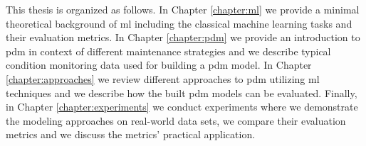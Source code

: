 \begin{introduction}
This thesis is organized as follows.
In Chapter \ref{chapter:ml} we provide a minimal theoretical background of \acrshort{ml} including the classical machine learning tasks and their evaluation metrics.
In Chapter \ref{chapter:pdm} we provide an introduction to \acrshort{pdm} in context of different maintenance strategies and we describe typical condition monitoring data used for building a \acrshort{pdm} model.
In Chapter \ref{chapter:approaches} we review different approaches to \acrshort{pdm} utilizing \acrshort{ml} techniques and we describe how the built \acrshort{pdm} models can be evaluated.
Finally, in Chapter \ref{chapter:experiments} we conduct experiments where we demonstrate the modeling approaches on real-world data sets, we compare their evaluation metrics and we discuss the metrics' practical application.

\end{introduction}
